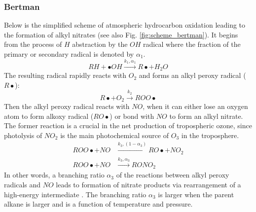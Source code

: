 \documentclass[11pt,a4paper]{article}
\begin{document}
\subsubsection*{Bertman}
Below is the simplified scheme of atmospheric hydrocarbon oxidation leading to the formation of alkyl nitrates (see also Fig. \ref{fig:scheme_bertman}). It begins from the process of $H$ abstraction by the $OH$ radical where the fraction of the primary or secondary radical is denoted by $\alpha_1$.
\begin{equation} \label{eq:alkane_oh}
RH + \bullet OH \xrightarrow{k_1, \alpha_1} R\bullet + H_2O
\end{equation}
The resulting radical rapidly reacts with $O_2$ and forms an alkyl peroxy radical ($R\bullet$):
\begin{equation} \label{eq:rad_o2}
R\bullet + O_2 \xrightarrow{k_2} ROO\bullet
\end{equation}
Then the alkyl peroxy radical reacts with $NO$, when it can either lose an oxygen atom to form alkoxy radical ($RO\bullet$) or bond with $NO$ to form an alkyl nitrate. The former reaction is a crucial in the net production of tropospheric ozone, since photolysis of $NO_2$ is the main photochemical source of $O_3$ in the troposphere.
\begin{subequations} \label{eq:peroxy_no0}
\begin{align}
ROO\bullet + NO &\xrightarrow{k_3, (1-\alpha_3)} RO\bullet + NO_2 \label{eq:peroxy_no1}\\
ROO\bullet + NO &\xrightarrow{k_3, \alpha_3} RONO_2 \label{eq:peroxy_no2}
\end{align}
\end{subequations}
In other words, a branching ratio $\alpha_3$ of the reactions between alkyl peroxy radicals and $NO$ leads to formation of nitrate products via rearrangement of a high-energy intermediate \citep{Bertman1995}. The branching ratio $\alpha_3$ is larger when the parent alkane is larger and is a function of temperature and pressure.
\end{document}
